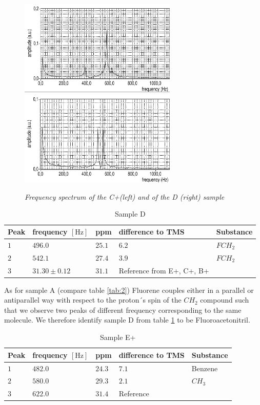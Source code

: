 \begin{figure}[h]
	\centering
	\includegraphics[width=75mm]{C+}
	\includegraphics[width=75mm]{D}
	\caption{\itshape Frequency spectrum of the C+(left) and of the D (right) sample}
	\label{fig:8}
\end{figure}
\noindent
\begin{table}[h!]
	\centering
	\begin{tabular}{lllll}
		\toprule
		Peak & frequency $\left[\mathrm{Hz}\right]$ & ppm & difference to TMS & Substance \\
		\midrule
		$ 1$ & $496.0$ & $25.1$ & $6.2$ & $FCH_2$\\
		
		$ 2$ & $ 542.1$ & $27.4$ &$ 3.9$ & $FCH_2$\\
		
		$ 3$ & $31.30 \pm 0.12$ &$31.1$ & Reference from E+, C+, B+ & \\
		\bottomrule
	\end{tabular}
	\caption{Sample D}
	\label{tab:5}
\end{table}
\newpage
\noindent
As for sample A (compare table \ref{tab:2}) Fluorene couples either in a parallel or antiparallel way with respect to the proton´s spin of the $CH_2$ compound such that we observe two peaks of different frequency corresponding to the same molecule. We therefore identify sample D from table \ref{tab:5} to be Fluoroacetonitril.\\
\begin{table}[h]
	\centering
	\begin{tabular}{lllll}
		\toprule
		Peak & frequency $\left[\mathrm{Hz}\right]$ & ppm & difference to TMS & Substance \\
		\midrule
		$ 1$ & $482.0$ & $24.3$ & $7.1$ & Benzene\\
		
		$ 2$ & $580.0$ & $29.3$ &$ 2.1$ & $CH_3$\\
		
		$ 3$ & $622.0$ &$31.4$ & Reference & \\
		\bottomrule
	\end{tabular}
	\caption{Sample E+}
	\label{tab:6}
\end{table}

